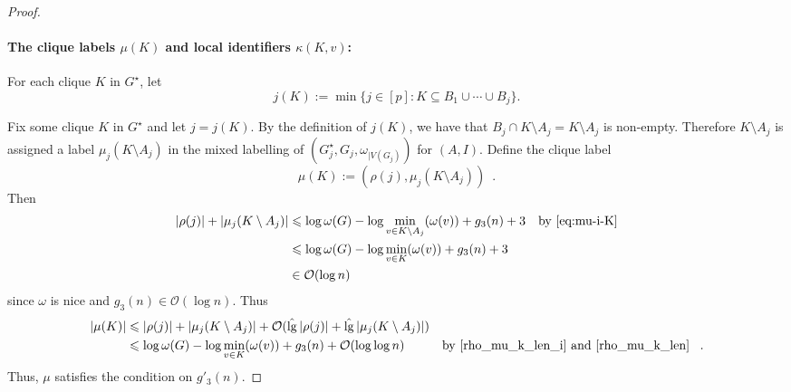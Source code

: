 \documentclass{patmorin}
\let\eqref\cref
\renewcommand{\le}{\leqslant}
\newcommand{\pat}[1]{\noindent\textcolor{Magenta}{PaMo: #1}}
\newcommand{\piotr}[1]{\noindent\textcolor{red}{PiMi: #1}}
\DeclareMathOperator{\lgg}{\hat{lg}}
\newcommand{\Oh}{\mathcal{O}}
\begin{document}
\begin{proof}
    \paragraph{\boldmath The clique labels $\mu(K)$ and local identifiers $\kappa(K,v)$:}
    For each clique $K$ in $G^\star$,
    let
    \[
      j(K):=\min\{j\in[p]:K\subseteq B_1\cup\cdots\cup B_j\}.
    \]

    Fix some clique $K$ in $G^\star$  and let $j=j(K)$.  By the definition of $j(K)$, we have that $B_j\cap K\setminus A_j=K\setminus A_j$ is non-empty.
    Therefore $K\setminus A_j$ is assigned a label $\mu_j(K\setminus A_j)$ in the mixed labelling of $(G^\star_j,G_j,\omega_{|V(G_j)})$ for $(A,I)$.
    Define the clique label
    \[
        \mu(K):=(\rho(j),\mu_j(K\setminus A_j)) \enspace .
    \]
    Then
    \begin{align}
       |\rho(j)|+|\mu_j(K\setminus A_j)|
       & \le \log\omega(G)-\log\min_{v\in K\setminus A_j}(\omega(v))+g_3(n)+3 &\textrm{by~\eqref{eq:mu-i-K}} \\
       & \le \log\omega(G)-\log\min_{v\in K}(\omega(v))+g_3(n)+3   \label{rho_mu_k_len_i} \\
       & \in \Oh(\log n)
       \label{rho_mu_k_len}
    \end{align}
    since $\omega$ is nice and $g_3(n)\in\Oh(\log n)$.  Thus
    \begin{align*}
        |\mu(K)|
        & \le |\rho(j)|+|\mu_j(K\setminus A_j)| + \Oh(\lgg|\rho(j)|+\lgg|\mu_j(K\setminus A_j)|) \\
        & \le \log\omega(G)-\log\min_{v\in K}(\omega(v)) + g_3(n)+\Oh(\log\log n) & \text{by \eqref{rho_mu_k_len_i} and \eqref{rho_mu_k_len} } \enspace .
    \end{align*}
    Thus, $\mu$ satisfies the condition on $g'_3(n)$.


\end{proof}
\end{document}
